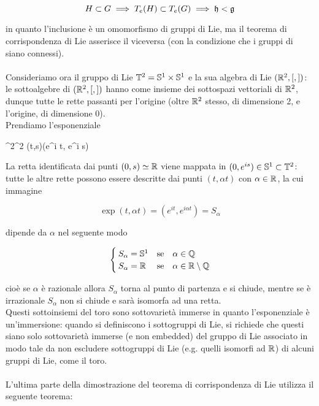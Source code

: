 \begin{equation}
	H \subset G \implies T_{e}(H) \subset T_{e}(G) \implies \mathfrak{h} < \mathfrak{g}
\end{equation}

in quanto l'inclusione è un omomorfismo di gruppi di Lie, ma il teorema di corrispondenza di Lie asserisce il viceversa (con la condizione che i gruppi di siano connessi).\\\\
%
Consideriamo ora il gruppo di Lie $ \mathbb{T}^{2} = \mathbb{S}^{1} \times \mathbb{S}^{1} $ e la sua algebra di Lie $ (\mathbb{R}^{2},[,]) $: le sottoalgebre di $ (\mathbb{R}^{2},[,]) $ hanno come insieme dei sottospazi vettoriali di $ \mathbb{R}^{2} $, dunque tutte le rette passanti per l'origine (oltre $ \mathbb{R}^{2} $ stesso, di dimensione 2, e l'origine, di dimensione 0).\\
Prendiamo l'esponenziale

\map{\exp}%
	{\R^{2}}{\T^{2}}%
	{(t,s)}{(e^{i t}, e^{i s})}

La retta identificata dai punti $ (0,s) \simeq \mathbb{R} $ viene mappata in $ (0,e^{i s}) \in \mathbb{S}^{1} \subset \mathbb{T}^{2} $: tutte le altre rette possono essere descritte dai punti $ (t,\alpha t) $ con $ \alpha \in \mathbb{R} $, la cui immagine

\begin{equation}
	\exp(t,\alpha t) = (e^{i t}, e^{i \alpha t}) = S_{\alpha}
\end{equation}

dipende da $ \alpha $ nel seguente modo

\begin{equation}
	\begin{cases}
		S_{\alpha} = \S^{1} & \qq*{se} \alpha \in \Q\\
		S_{\alpha} = \R & \qq*{se} \alpha \in \R \setminus \Q
	\end{cases}
\end{equation}

cioè se $ \alpha $ è razionale allora $ S_{\alpha} $ torna al punto di partenza e si chiude, mentre se è irrazionale $ S_{\alpha} $ non si chiude e sarà isomorfa ad una retta.\\
Questi sottoinsiemi del toro sono sottovarietà immerse in quanto l'esponenziale è un'immersione: quando si definiscono i sottogruppi di Lie, si richiede che questi siano solo sottovarietà immerse (e non embedded) del gruppo di Lie associato in modo tale da non escludere sottogruppi di Lie (e.g. quelli isomorfi ad $ \mathbb{R} $) di alcuni gruppi di Lie, come il toro.\\\\
%
L'ultima parte della dimostrazione del teorema di corrispondenza di Lie utilizza il seguente teorema:

